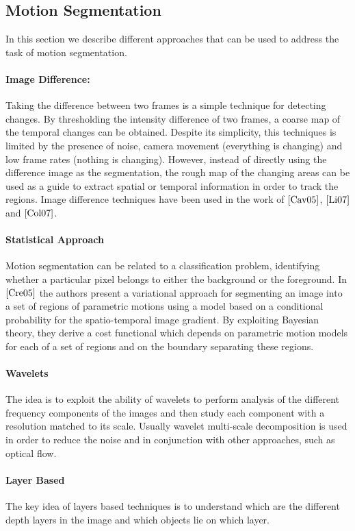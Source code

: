 \subsection{Motion Segmentation}
In this section we describe different approaches that can be used to address the task of motion segmentation.

\paragraph{Image Difference:} Taking the difference between two frames is a simple technique for detecting changes. By thresholding the intensity difference of two frames, a coarse map of the temporal changes can be obtained. Despite its simplicity, this techniques is limited by the presence of noise, camera movement (everything is changing) and low frame rates (nothing is changing). However, instead of directly using the difference image as the segmentation, the rough map of the changing areas can be used as a guide to extract spatial or temporal information in order to track the regions. Image difference techniques have been used in the work of $\cite{Cav05}$, $\cite{Li07}$ and $\cite{Col07}$.

\paragraph{Statistical Approach} Motion segmentation can be related to a classification problem, identifying whether a particular pixel belongs to either the background or the foreground. In $\cite{Cre05}$ the authors present a variational approach for segmenting an image into a set of regions of parametric motions using a model based on a conditional probability for the spatio-temporal image gradient. By exploiting Bayesian theory, they derive a cost functional which depends on parametric motion models for each  of a set of regions and on the boundary separating these regions.

\paragraph{Wavelets}
The idea is to exploit the ability of wavelets to perform analysis of the different frequency components of the images and then study each component with a resolution matched to its scale. Usually wavelet multi-scale decomposition is used in order to reduce the noise and in conjunction with other approaches, such as optical flow.

\paragraph{Layer Based} The key idea of layers based techniques is to understand which are the different depth layers in the image and which objects lie on which layer. 

